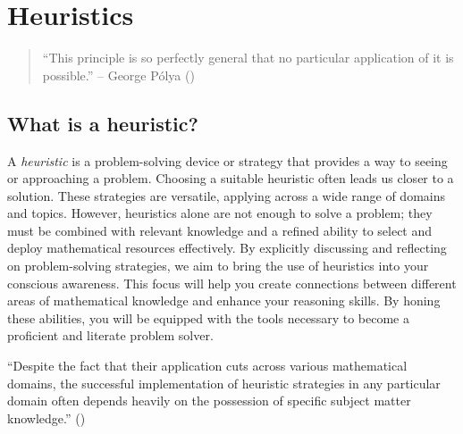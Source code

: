\documentclass[
  a4paper,
  DIV=11,
  numbers=noendperiod,
  oneside]{scrreprt}
\begin{document}
\chapter{Heuristics}\label{sec-heuristics}

\begin{quote}
``This principle is so perfectly general that no particular application
of it is possible.'' -- George Pólya
()
\end{quote}

\section{What is a heuristic?}\label{what-is-a-heuristic}

A \emph{heuristic} is a problem-solving device or strategy that provides
a way to seeing or approaching a problem. Choosing a suitable heuristic
often leads us closer to a solution. These strategies are versatile,
applying across a wide range of domains and topics. However, heuristics
alone are not enough to solve a problem; they must be combined with
relevant knowledge and a refined ability to select and deploy
mathematical resources effectively. By explicitly discussing and
reflecting on problem-solving strategies, we aim to bring the use of
heuristics into your conscious awareness. This focus will help you
create connections between different areas of mathematical knowledge and
enhance your reasoning skills. By honing these abilities, you will be
equipped with the tools necessary to become a proficient and literate
problem solver.

\begin{tcolorbox}[enhanced jigsaw, colbacktitle=quarto-callout-warning-color!10!white, left=2mm, colback=white, rightrule=.15mm, toprule=.15mm, bottomrule=.15mm, colframe=quarto-callout-warning-color-frame, bottomtitle=1mm, opacityback=0, toptitle=1mm, titlerule=0mm, coltitle=black, breakable, title=\textcolor{quarto-callout-warning-color}{\faExclamationTriangle}\hspace{0.5em}{Heuristics will not replace shaky mastery of a subject!}, arc=.35mm, opacitybacktitle=0.6, leftrule=.75mm]

``Despite the fact that their application cuts across various
mathematical domains, the successful implementation of heuristic
strategies in any particular domain often depends heavily on the
possession of specific subject matter knowledge.''
()

\end{tcolorbox}
\end{document}
